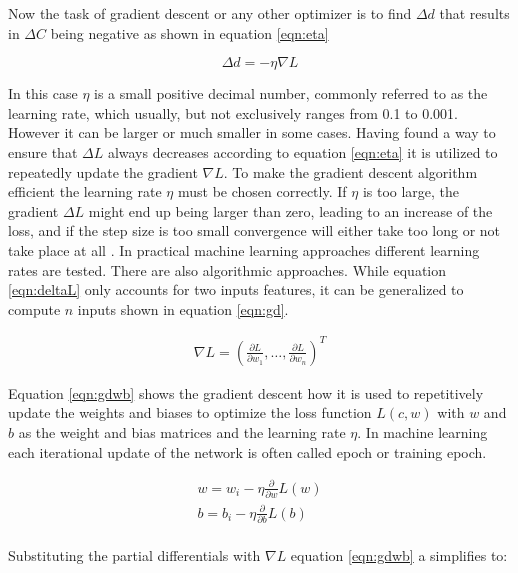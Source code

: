 Now the task of gradient descent or any other optimizer is to find $\Delta d$ that results in $\Delta C$ being negative
as shown in equation \ref{eqn:eta}

\begin{equation}
 \Delta d = -\eta \nabla L
 \label{eqn:eta}
\end{equation}

In this case $\eta$ is a small positive decimal number, commonly referred to as the learning rate, which
usually, but not exclusively ranges from 0.1 to 0.001. However it can be larger or much smaller in some
cases. Having found a way to ensure that $\Delta L$ always decreases according to equation \ref{eqn:eta} it is
utilized to repeatedly update the gradient $\nabla L$. To make the gradient descent algorithm efficient the
learning rate $\eta$ must be chosen correctly. If $\eta$ is too large, the gradient $\Delta L$ might end up
being larger than zero, leading to an increase of the loss, and if the step size is too small convergence will
either take too long or not take place at all \cite{bergstra2011algorithms}. In practical machine learning
approaches different learning rates are tested. There are also algorithmic approaches. While equation
\ref{eqn:deltaL} only accounts for two inputs features, it can be generalized to compute $n$ inputs shown in
equation \ref{eqn:gd}.

\begin{eqnarray}
 \nabla L = \left(\frac{\partial L}{\partial w_1}, \ldots ,
 \frac{\partial L}{\partial w_n}\right)^T
 \label{eqn:gd}
\end{eqnarray}

Equation \ref{eqn:gdwb} shows the gradient descent how it is used to repetitively update the weights and
biases to optimize the loss function $L(c,w)$ with $w$ and $b$ as the weight and bias matrices and the
learning rate $\eta$. In machine learning each iterational update of the network is often called epoch or
training epoch.

\begin{subequations}
 \begin{align}
   w = w_i - \eta \frac{\partial}{\partial w}L(w) \\
   b = b_i - \eta \frac{\partial}{\partial b}L(b) \\
 \end{align}
 \label{eqn:gdwb}
\end{subequations}

Substituting the partial differentials with $\nabla L$ equation \ref{eqn:gdwb} a simplifies to:

